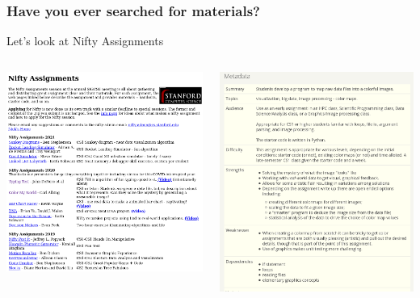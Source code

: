 \documentclass[aspectratio=169]{beamer}
\begin{document}
\begin{frame}
  \frametitle{Have you ever searched for materials?}

  Let's look at Nifty Assignments

  \begin{columns}
    \includegraphics[width=\linewidth]{figs/Nifty.png}
    
    \includegraphics[width=\linewidth]{figs/AParticularNifty.png}
  \end{columns}
  
\end{frame}
\end{document}

